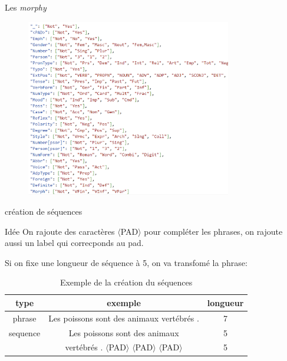 \documentclass[11pt]{beamer}
\begin{document}
\begin{frame}{Les \textit{morphy}}
    \begin{figure}
        \centering
        \includegraphics[width=0.8\textwidth]{all_morphy.png}
    \end{figure}
\end{frame}

\begin{frame}{création de séquences}
    \begin{exampleblock}{Idée}
        On rajoute des caractères $\langle$PAD$\rangle$ pour compléter les phrases,
        on rajoute aussi un label qui correcponds au pad.
    \end{exampleblock}

    \bigskip
    Si on fixe une longueur de séquence à 5, on va transfomé la phrase:
    \begin{table}
        \centering
        \begin{tabular}{|c|c|c|}
            \hline
            \textbf{type} & \textbf{exemple} & \textbf{longueur} \\
            \hline
            phrase & Les poissons sont des animaux vertébrés . & 7 \\
            \hline
            sequence & Les poissons sont des animaux & 5\\
             & vertébrés . $\langle$PAD$\rangle$ $\langle$PAD$\rangle$ $\langle$PAD$\rangle$ & 5\\
            \hline
        \end{tabular}
        \caption{Exemple de la création du séquences}
    \end{table}
\end{frame}
\end{document}
